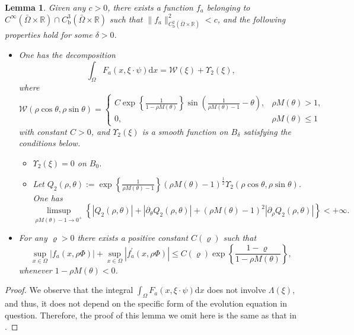\documentclass{elsarticle}
\newtheorem{lemma}{Lemma}[section]
\begin{document}
\begin{lemma} \label{decomposition_2}
Given any $c>0$, there exists a function $f_a$ belonging to $C^{\infty}(\bar{\Omega}\times\mathbb{R})\cap {C^3_{\mathrm{b}}(\bar{\Omega}\times\mathbb{R})}$ such that $\|f_a\|^2_{C^2_{\mathrm{b}}(\bar{\Omega}\times\mathbb{R})} < c$, and the following properties hold for some $\delta > 0$.
\begin{itemize}
\item[{\rm{(1)}}] One has the decomposition
\[
\int_{\Omega}F_a(x, \xi\cdot\psi)\mathrm{d}x =  \mathcal{W}(\xi) + \Upsilon_2(\xi),
\]
where
\begin{equation*}
\mathcal{W}(\rho\cos\theta, \rho\sin\theta) =
 \left\{
\begin{array}{cc}
C\exp\left\{\frac{1}{1-\rho M(\theta)}\right\}\sin\left( \frac{1}{\rho M(\theta)-1} -\theta\right), & \rho M(\theta) >1, \\
0,& \rho M(\theta)\leqslant 1
\end{array}
\right.
\end{equation*}
with constant $C>0$, and $\Upsilon_2(\xi)$ is a smooth function on $B_{\delta}$ satisfying the conditions below.
\begin{itemize}
\item $\Upsilon_2(\xi) = 0$ on $B_{0}$.
\item Let $Q_2(\rho, \theta) := \exp\left\{\frac{1}{\rho M(\theta)-1}\right\}\left(\rho M(\theta)-1\right)^{\frac{1}{2}}\Upsilon_2 (\rho\cos\theta, \rho\sin\theta)$. One has 
\[
	\limsup_{\rho M(\theta)-1\rightarrow 0^{+}}\left\{ |Q_2(\rho, \theta)| + |\partial_{\theta}Q_2(\rho, \theta)| + (\rho M(\theta)-1)^2|\partial_{\rho}Q_2(\rho, \theta)|\right\} < +\infty.
\]
\end{itemize}
\item[{\rm{(2)}}] For any $\varrho > 0$ there exists a positive constant $C(\varrho)$ such that
\begin{equation} \label{estimate:nonlinearity}
	\sup_{x\in\Omega}|f_a(x, \rho\Phi)| + \sup_{x\in\Omega}|f^{\prime}_a(x, \rho\Phi)| \leqslant C(\varrho)\exp\left\{ \frac{1-\varrho}{1- \rho M(\theta)} \right\},
\end{equation}
whenever $1- \rho M(\theta)<0$.
\end{itemize}
\end{lemma}
\begin{proof}
We observe that the integral $\int_{\Omega}F_a(x, \xi\cdot\psi)\mathrm{d}x $ does not involve $\Lambda(\xi)$, and thus, it does not depend on the specific form of the evolution equation in question. Therefore, the proof of this lemma we omit here is the same as that in \cite[Proposition 3.1]{polavcik2002nonconvergent}. 
\end{proof}
\end{document}
